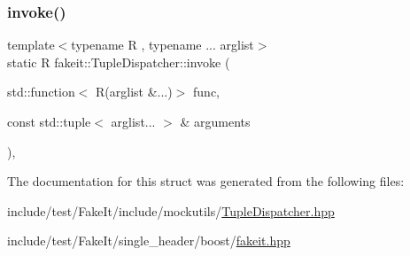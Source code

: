 \subsubsection{\texorpdfstring{invoke()}{invoke()}\hspace{0.1cm}{\footnotesize\ttfamily [9/9]}}
{\footnotesize\ttfamily template$<$typename R , typename ... arglist$>$ \\
static R fakeit\+::\+Tuple\+Dispatcher\+::invoke (\begin{DoxyParamCaption}\item[{std\+::function$<$ R(arglist \&...)$>$}]{func,  }\item[{const std\+::tuple$<$ arglist... $>$ \&}]{arguments }\end{DoxyParamCaption})\hspace{0.3cm}{\ttfamily [inline]}, {\ttfamily [static]}}



The documentation for this struct was generated from the following files\+:\begin{DoxyCompactItemize}
\item 
include/test/\+Fake\+It/include/mockutils/\mbox{\hyperlink{TupleDispatcher_8hpp}{Tuple\+Dispatcher.\+hpp}}\item 
include/test/\+Fake\+It/single\+\_\+header/boost/\mbox{\hyperlink{single__header_2boost_2fakeit_8hpp}{fakeit.\+hpp}}\end{DoxyCompactItemize}
